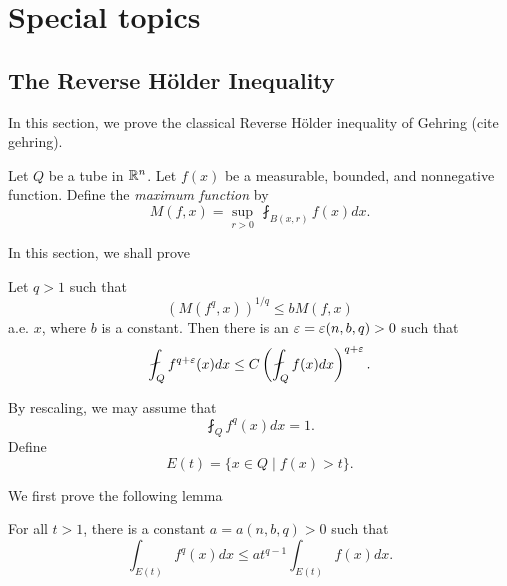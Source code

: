 
 \chapter{Special topics}\label{Special_topics}
 \section{The Reverse H\"older Inequality}\label{Reverse_holder}
 In this section, we prove the classical Reverse H\"older inequality of Gehring (cite gehring).
 
 
    Let $Q$ be a tube in $\mathbb R^n$. Let $f(x)$ be a measurable, bounded, and nonnegative function. Define the \emph{maximum function} by
\[
M(f, x)=\sup_{r>0}\,\fint_{B(x,r)} f(x) dx.
\]

In this section, we shall prove
\begin{theorem} Let $q>1$ such that 
\[
(M(f^q,x))^{1/q}\leq b M(f,x)
\]
a.e. $x$, where $b$ is a constant. Then there is an $\varepsilon=\varepsilon(n,b,q)>0$ such that 
\[
\fint_Q f^{q+\eps}(x) dx\leq C \left(\fint_Q f(x) dx\right)^{q+\eps}.
\]
\end{theorem}
 

 By rescaling, we may assume that 
 \begin{equation}\label{0}
 \fint_Q f^q(x) dx=1.
 \end{equation}
 Define
 \[
 E(t)=\{x\in Q\mid f(x)>t\}.
 \]
 

 
 We first prove the following lemma
 
 \begin{lemma}
For all $t>1$, there is a constant $a=a(n,b,q)>0$ such that 
\[
\int_{E(t)} f^q(x) dx\leq at^{q-1}\int_{E(t)} f(x) dx.
\]
\end{lemma}

